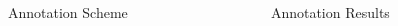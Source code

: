 \documentclass[final,t]{beamer}
\begin{document}
\begin{frame}{}
\begin{columns}[t]
\begin{column}{.33\linewidth}
\begin{block}{Annotation Scheme}
\begin{center}
\begin{minipage}{.85\textwidth}
\begin{enumerate}
\end{enumerate}



\end{minipage}
\end{center}
\vspace{-.5em}
\end{block}

\end{column}

\begin{column}{.33\linewidth}
\vspace{-1em}
\begin{block}{Annotation Results}
\begin{center}
\begin{minipage}{.85\textwidth}



\end{minipage}
\end{center}
\end{block}
\end{column}
\end{columns}
\end{frame}
\end{document}
